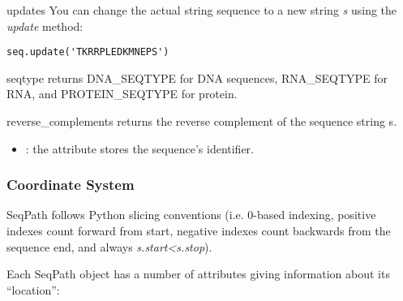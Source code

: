 \documentclass{howto}
\begin{document}
\begin{funcdesc}{update}{s}
  You can change the actual string sequence to a new string {\em s}
  using the {\em update} method:

\begin{verbatim}
seq.update('TKRRPLEDKMNEPS')
\end{verbatim}
\end{funcdesc}

\begin{funcdesc}{seqtype}{}
  returns DNA_SEQTYPE for DNA sequences, 
  RNA_SEQTYPE for RNA, and PROTEIN_SEQTYPE for protein.
\end{funcdesc}


\begin{funcdesc}{reverse_complement}{s}
  returns the reverse complement of the sequence string s.
\end{funcdesc}


\begin{itemize}
\item
{}: the  attribute stores the sequence's identifier.

\end{itemize}

\subsubsection{Coordinate System}
SeqPath follows Python slicing conventions (i.e. 0-based indexing, positive indexes
count forward from start, negative indexes count backwards from the sequence
end, and always {\em s.start<s.stop}).

Each SeqPath object has a number of attributes giving information about its
``location'':
\end{document}
